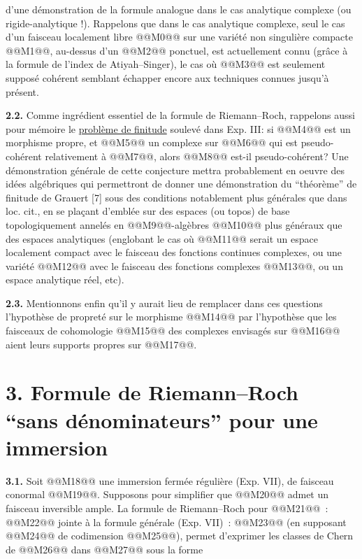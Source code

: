 
d'une
démonstration de la formule analogue dans le cas analytique complexe (ou rigide-analytique !). Rappelons que dans le cas analytique complexe, seul le cas d'un faisceau localement libre @@M0@@ sur une variété non singulière compacte @@M1@@, au-dessus d'un @@M2@@ ponctuel, est actuellement connu (grâce à la formule de l'index de Atiyah--Singer), le cas où @@M3@@ est seulement supposé cohérent semblant échapper encore aux techniques connues jusqu'à présent.

\textbf{2.2.} Comme ingrédient essentiel de la formule de Riemann--Roch, rappelons aussi pour mémoire le \uline{problème de finitude} soulevé dans Exp. III: si @@M4@@ est un morphisme propre, et @@M5@@ un complexe sur @@M6@@ qui est pseudo-cohérent relativement à @@M7@@, alors @@M8@@ est-il pseudo-cohérent? Une démonstration générale de cette conjecture mettra probablement en oeuvre des idées algébriques qui permettront de donner une démonstration du ``théorème'' de finitude de Grauert [7] sous des conditions notablement plus générales que dans loc. cit., en se plaçant d'emblée sur des espaces (ou topos) de base topologiquement annelés en @@M9@@-algèbres @@M10@@ plus généraux que des espaces analytiques (englobant le cas où @@M11@@ serait un espace localement compact avec le faisceau des fonctions continues complexes, ou une variété @@M12@@ avec le faisceau des fonctions complexes @@M13@@, ou un espace analytique réel, etc).

\textbf{2.3.} Mentionnons enfin qu'il y aurait lieu de remplacer dans ces questions l'hypothèse de propreté sur le morphisme @@M14@@ par l'hypothèse que les faisceaux de cohomologie @@M15@@ des complexes envisagés sur @@M16@@ aient leurs supports propres sur @@M17@@.

\section*{3. Formule de Riemann--Roch ``sans dénominateurs'' pour une immersion}

\textbf{3.1.} Soit @@M18@@ une immersion fermée régulière (Exp. VII), de faisceau conormal @@M19@@. Supposons pour simplifier que @@M20@@ admet un faisceau inversible ample. La formule de Riemann--Roch pour @@M21@@~:
@@M22@@
jointe à la formule générale (Exp. VII)~:
@@M23@@
(en supposant @@M24@@ de codimension @@M25@@), permet d'exprimer les classes de Chern de @@M26@@ dans @@M27@@ sous la forme
